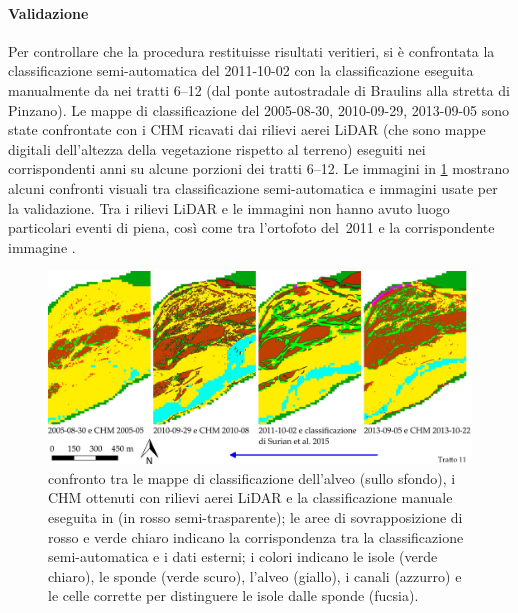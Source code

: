 \paragraph{Validazione}
Per controllare che la procedura restituisse risultati veritieri, si è confrontata la classificazione semi-automatica del 2011-10-02 con la classificazione eseguita manualmente da  nei tratti \numrange[range-phrase={$\div$}]{6}{12} (dal ponte autostradale di Braulins alla stretta di Pinzano).
Le mappe di classificazione del 2005-08-30, 2010-09-29, 2013-09-05 sono state confrontate con i CHM ricavati dai rilievi aerei LiDAR (che sono mappe digitali dell'altezza della vegetazione rispetto al terreno) eseguiti nei corrispondenti anni su alcune porzioni dei tratti \numrange[range-phrase={$\div$}]{6}{12}.
Le immagini in \cref{fig:validazione-class-is-fl} mostrano alcuni confronti visuali tra classificazione semi-automatica e immagini usate per la validazione.
Tra i rilievi LiDAR e le immagini \AST{} non hanno avuto luogo particolari eventi di piena, così come tra l'ortofoto del~2011 e la corrispondente immagine \AST{}.
%	
\begin{figure}
	\centering
	\includegraphics[width=\textwidth]{files/class_mia_vs_surian_chm.jpeg}
	\caption[validazione visuale della classificazione dell'alveo]{confronto tra le mappe di classificazione dell'alveo (sullo sfondo), i CHM ottenuti con rilievi aerei LiDAR e la classificazione manuale eseguita in  (in rosso semi-trasparente); le aree di sovrapposizione di rosso e verde chiaro indicano la corrispondenza tra la classificazione semi-automatica e i dati esterni; i colori indicano le isole (verde chiaro), le sponde (verde scuro), l'alveo (giallo), i canali (azzurro) e le celle corrette per distinguere le isole dalle sponde (fucsia).}
	\label{fig:validazione-class-is-fl}
\end{figure}
%
